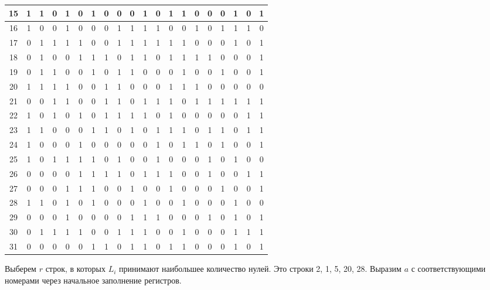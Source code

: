 \documentclass[letterpaper,11pt,openany]{book}
\begin{document}
\begin{adjustbox}{center}
\begin{tabular}{||c|c|c|c|c|c|c|c|c|c|c|c|c|c|c|c|c|c|c|c||}
\hline
15 & 1 & 1 & 0 & 1 & 0 & 1 & 0 & 0 & 0 & 1 & 0 & 1 & 1 & 0 & 0 & 0 & 1 & 0 & 1 \\
\hline
16 & 1 & 0 & 0 & 1 & 0 & 0 & 0 & 1 & 1 & 1 & 1 & 0 & 0 & 1 & 0 & 1 & 1 & 1 & 0 \\
\hline
17 & 0 & 1 & 1 & 1 & 1 & 0 & 0 & 1 & 1 & 1 & 1 & 1 & 1 & 0 & 0 & 0 & 1 & 0 & 1 \\
\hline
18 & 0 & 1 & 0 & 0 & 1 & 1 & 1 & 0 & 1 & 1 & 0 & 1 & 1 & 1 & 1 & 0 & 0 & 0 & 1 \\
\hline
19 & 0 & 1 & 1 & 0 & 0 & 1 & 0 & 1 & 1 & 0 & 0 & 0 & 1 & 0 & 0 & 1 & 0 & 0 & 1 \\
\hline
20 & 1 & 1 & 1 & 1 & 0 & 0 & 1 & 1 & 0 & 0 & 0 & 1 & 1 & 1 & 0 & 0 & 0 & 0 & 0 \\
\hline
21 & 0 & 0 & 1 & 1 & 0 & 0 & 1 & 1 & 0 & 1 & 1 & 1 & 0 & 1 & 1 & 1 & 1 & 1 & 1 \\
\hline
22 & 1 & 0 & 1 & 0 & 1 & 0 & 1 & 1 & 1 & 1 & 0 & 1 & 0 & 0 & 0 & 0 & 0 & 1 & 1 \\
\hline
23 & 1 & 1 & 0 & 0 & 0 & 1 & 1 & 0 & 1 & 0 & 1 & 1 & 1 & 0 & 1 & 1 & 0 & 1 & 1 \\
\hline
24 & 1 & 0 & 0 & 0 & 1 & 0 & 0 & 0 & 0 & 0 & 1 & 0 & 1 & 1 & 0 & 1 & 0 & 0 & 1 \\
\hline
25 & 1 & 0 & 1 & 1 & 1 & 1 & 0 & 1 & 0 & 0 & 1 & 0 & 0 & 0 & 1 & 0 & 1 & 0 & 0 \\
\hline
26 & 0 & 0 & 0 & 0 & 1 & 1 & 1 & 1 & 0 & 1 & 1 & 1 & 0 & 0 & 1 & 0 & 0 & 1 & 1 \\
\hline
27 & 0 & 0 & 0 & 1 & 1 & 1 & 0 & 0 & 1 & 0 & 0 & 1 & 0 & 0 & 0 & 1 & 0 & 0 & 1 \\
\hline
28 & 1 & 1 & 0 & 1 & 0 & 1 & 0 & 0 & 0 & 1 & 0 & 0 & 1 & 0 & 0 & 0 & 1 & 0 & 0 \\
\hline
29 & 0 & 0 & 0 & 1 & 0 & 0 & 0 & 0 & 1 & 1 & 1 & 0 & 0 & 0 & 1 & 0 & 1 & 0 & 1 \\
\hline
30 & 0 & 1 & 1 & 1 & 1 & 0 & 0 & 1 & 1 & 1 & 0 & 0 & 1 & 0 & 0 & 0 & 1 & 1 & 1 \\
\hline
31 & 0 & 0 & 0 & 0 & 0 & 1 & 1 & 0 & 1 & 1 & 0 & 1 & 1 & 0 & 0 & 0 & 1 & 0 & 1 \\
\hline
\end{tabular}
\end{adjustbox}

\medskip

Выберем $r$ строк, в которых $L_i$ принимают наибольшее количество нулей. Это строки 2, 1, 5, 20, 28. Выразим $a$ с соответствующими номерами через начальное заполнение регистров.
\end{document}

